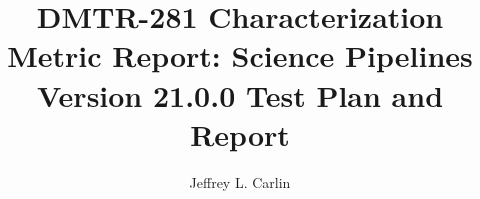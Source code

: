 \documentclass[DM,lsstdraft,toc]{lsstdoc}
\begin{document}
\def\milestoneName{Characterization Metric Report: Science Pipelines Version 21.0.0}
\def\milestoneId{DMTR-281}
\def\product{Data Management}


\title{DMTR-281 Characterization Metric Report: Science Pipelines Version 21.0.0 Test Plan and Report}
\setDocRef{\lsstDocType-\lsstDocNum}
\date{\vcsdate}
\author{Jeffrey L. Carlin}



\end{document}
